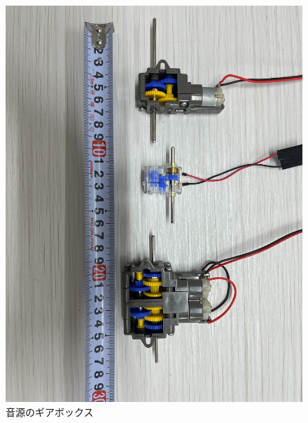 \documentclass[../main]{subfiles}
\begin{document}
\begin{figure}[t]
  \centering
  \includegraphics[angle=90,keepaspectratio, width=1.0\linewidth]{chap4/gearbox.jpg}
  \caption{音源のギアボックス}
  \label{fig:gearbox}
\end{figure}
\end{document}
